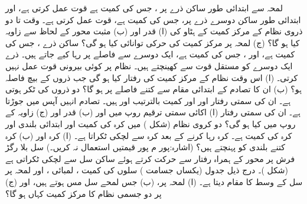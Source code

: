   لمحہ  سے ابتدائی طور ساکن ذرے پر  ، جس کی کمیت  ہے   قوت عمل کرتی ہے، اور  ابتدائی طور ساکن دوسرے  ذرے پر، جس کی کمیت  ہے،   قوت عمل کرتی ہے۔ وقت  تا   دو ذروی نظام  کے مرکز کمیت کے ہٹاو کی (ا) قدر  اور (ب) مثبت  محور کے لحاظ سے زاویہ کیا ہو گا؟ (ج)  لمحہ  پر مرکز کمیت کی حرکی توانائی کیا ہو گی؟
ساکن ذرے ، جس کی کمیت  ہے،  اور  ، جس کی کمیت  ہے، ایک دوسرے سے     فاصلے پر  رہا کیے جاتے ہیں۔ ذرے ایک دوسرے کو  مستقل قوت سے کھینچتے ہیں۔ نظام پر کوئی بیرونی قوت عمل نہیں کرتی۔ (ا) اس وقت  نظام کے  مرکز کمیت  کی رفتار کیا ہو گی جب ذروں کے بیچ فاصلہ  ہو؟ (ب)  ان کا  تصادم  کے ابتدائی مقام سے کتنے فاصلے پر ہو گا؟
دو ذروں کی  ٹکر ہوتی ہے۔ ان کی سمتی رفتار  اور    اور کمیت بالترتیب  اور  ہیں۔ تصادم انہیں آپس میں جوڑتا ہے۔ ان کی سمتی رفتار (ا) اکائی سمتی ترقیم  روپ میں  اور (ب) قدر اور (ج) زاویہ کے روپ میں کیا ہو گی؟
دو کروی  نظام (شکل ) میں  کرہ  کی کمیت   اور ابتدائی بلندی  اور کرہ  کی کمیت  ہے۔ کرہ  رہا کرنے کے بعد کرہ  سے لچکی ٹکراتا ہے۔ (ا) کرہ  اور (ب) کرہ  کتنے بلندی کو پہنچتے ہیں؟ (اشارہ:پور م پور قیمتیں  استعمال  نہ  کریں۔)
سل  بلا رگڑ   فرش پر محور  کے ہمراہ  رفتار سے حرکت کرتے ہوئے  ساکن سل   سے لچکی ٹکراتی ہے (شکل )۔ درج ذیل جدول   (یکساں جسامت ) سلوں کی کمیت ، لمبائی  ، اور لمحہ    پر  سل کے  وسط  کا مقام دیتا ہے۔ (ا) لمحہ  پر، (ب)  جس لمحے سل مس ہوتے ہیں، اور (ج)   پر  دو  جسمی نظام کا مرکز کمیت کہاں ہو گا؟

